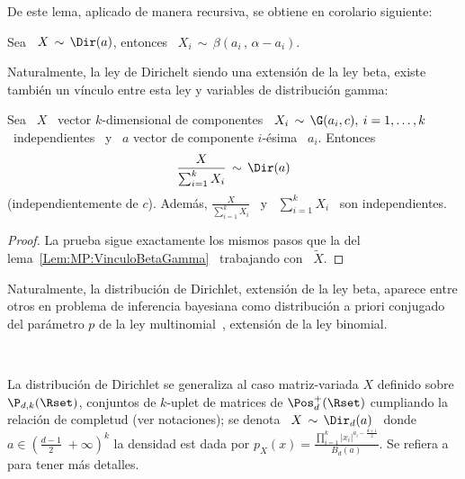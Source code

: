 De este lema, aplicado de manera recursiva, se obtiene en corolario siguiente:
%
\begin{corolario}
\label{Cor:MP:MarginalDirichletBeta}
%
  Sea  \ $X  \,  \sim \,  \Dir(a)$, entonces  \  $\displaystyle X_i  \, \sim  \,
  \beta\left( a_i \, , \, \alpha-a_i \right)$.
\end{corolario}

Naturalmente, la ley de Dirichelt siendo  una extensi\'on de la ley beta, existe
tambi\'en un v\'inculo entre esta ley y variables de distribuci\'on gamma:
%
\begin{lema}
\label{Lem:MP:VinculoDirichletGamma}
%
Sea \ $X$  \ vector $k$-dimensional de componentes \ $X_i  \, \sim \, \G(a_i,c),
\:  i  = 1,  \ldots  , k$  \  independientes  \ y  \  $a$  vector de  componente
$i$-\'esima \ $a_i$. Entonces
  \[
  \frac{X}{\sum_{i=1}^k X_i} \, \sim \, \Dir(a)
  \]
  (independientemente  de $c$).   Adem\'as, $\frac{X}{\sum_{i=1}^k  X_i}$ \  y \
  $\sum_{i=1}^k X_i$ \ son independientes.
\end{lema}
%
\begin{proof}
  La    prueba   sigue    exactamente   los    mismos   pasos    que    la   del
  lema~\ref{Lem:MP:VinculoBetaGamma} \ trabajando con \ $\widetilde{X}$.
\end{proof}

Naturalmente,  la  distribuci\'on de  Dirichlet,  extensi\'on  de  la ley  beta,
aparece entre  otros en problema  de inferencia bayesiana como  distribuci\'on a
priori  conjugado  del  par\'ametro  $p$  de  la  ley  multinomial~\cite{Rob07},
extensi\'on de la ley binomial.


\

La distribuci\'on de Dirichlet se generaliza al caso matriz-variada $X$ definido
sobre $\P_{d,k}(\Rset)$,  conjuntos de  $k$-uplet de matrices  de $\Pos_d^+(\Rset)$
cumpliando la relaci\'on  de completud (ver notaciones); se denota  \ $X \, \sim
\, \Dir_d(a)$  \ donde \  $a \in \left(  \frac{d-1}{2} \; +\infty  \right)^k$ la
densidad  est dada por  $\displaystyle p_X(x)  = \frac{\prod_{i=1}^k  \left| x_i
  \right|^{a_i-\frac{d+1}{2}}}{B_d(a)}$.   Se  refiera a~\cite[Cap.~6]{GupNag99}
para tener m\'as detalles.